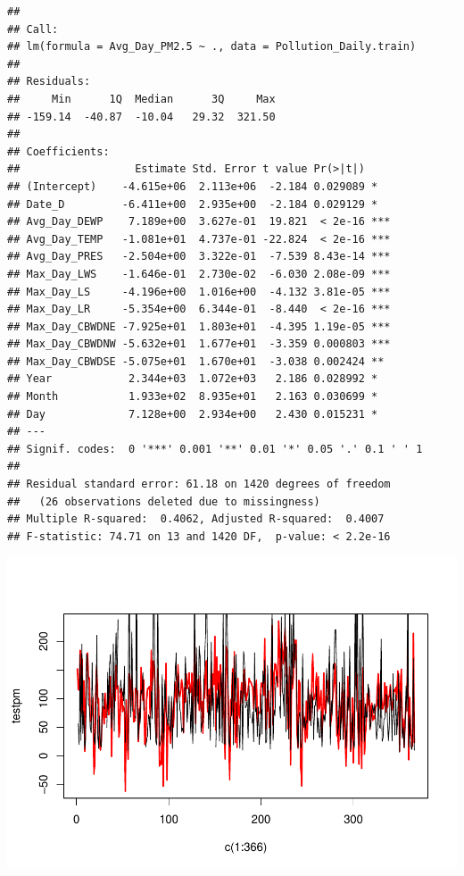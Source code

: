 \documentclass[
]{article}
\begin{document}
\begin{verbatim}
## 
## Call:
## lm(formula = Avg_Day_PM2.5 ~ ., data = Pollution_Daily.train)
## 
## Residuals:
##     Min      1Q  Median      3Q     Max 
## -159.14  -40.87  -10.04   29.32  321.50 
## 
## Coefficients:
##                  Estimate Std. Error t value Pr(>|t|)    
## (Intercept)    -4.615e+06  2.113e+06  -2.184 0.029089 *  
## Date_D         -6.411e+00  2.935e+00  -2.184 0.029129 *  
## Avg_Day_DEWP    7.189e+00  3.627e-01  19.821  < 2e-16 ***
## Avg_Day_TEMP   -1.081e+01  4.737e-01 -22.824  < 2e-16 ***
## Avg_Day_PRES   -2.504e+00  3.322e-01  -7.539 8.43e-14 ***
## Max_Day_LWS    -1.646e-01  2.730e-02  -6.030 2.08e-09 ***
## Max_Day_LS     -4.196e+00  1.016e+00  -4.132 3.81e-05 ***
## Max_Day_LR     -5.354e+00  6.344e-01  -8.440  < 2e-16 ***
## Max_Day_CBWDNE -7.925e+01  1.803e+01  -4.395 1.19e-05 ***
## Max_Day_CBWDNW -5.632e+01  1.677e+01  -3.359 0.000803 ***
## Max_Day_CBWDSE -5.075e+01  1.670e+01  -3.038 0.002424 ** 
## Year            2.344e+03  1.072e+03   2.186 0.028992 *  
## Month           1.933e+02  8.935e+01   2.163 0.030699 *  
## Day             7.128e+00  2.934e+00   2.430 0.015231 *  
## ---
## Signif. codes:  0 '***' 0.001 '**' 0.01 '*' 0.05 '.' 0.1 ' ' 1
## 
## Residual standard error: 61.18 on 1420 degrees of freedom
##   (26 observations deleted due to missingness)
## Multiple R-squared:  0.4062, Adjusted R-squared:  0.4007 
## F-statistic: 74.71 on 13 and 1420 DF,  p-value: < 2.2e-16
\end{verbatim}

\includegraphics{Final_Project_1_files/figure-latex/unnamed-chunk-4-1.pdf}
\end{document}
